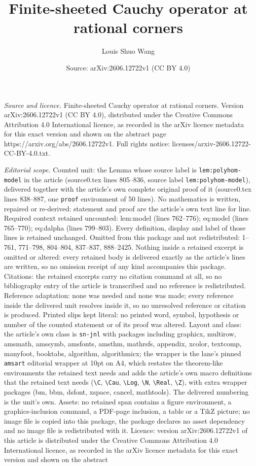 \documentclass[10pt,a4paper]{amsart}
\title[Finite-sheeted Cauchy operator at rational corners]{Finite-sheeted Cauchy operator at rational corners}
\author{Louis Shuo Wang}
\date{Source: arXiv:2606.12722v1 (CC BY 4.0)}
\begin{document}
\maketitle

\noindent\emph{Source and licence.} Finite-sheeted Cauchy operator at rational corners. Version arXiv:2606.12722v1 (CC BY 4.0), distributed under the Creative Commons Attribution 4.0 International licence, as recorded in the arXiv licence metadata for this exact version and shown on the abstract page https://arxiv.org/abs/2606.12722v1. Full rights notice: licenses/arxiv-2606.12722-CC-BY-4.0.txt.\par\smallskip

\noindent\textit{Editorial scope.} Counted unit: the Lemma whose source label is \texttt{lem:polyhom-model} in the article (source0.tex lines 805--836, source label \texttt{lem:polyhom-model}), delivered together with the article's own complete original proof of it (source0.tex lines 838--887, one \texttt{proof} environment of 50 lines). No mathematics is written, repaired or re-derived: statement and proof are the article's own text line for line. Required context retained uncounted: lem:model (lines 762--776); eq:model (lines 765--770); eq:dalpha (lines 799--803). Every definition, display and label of those lines is retained unchanged. Omitted from this package and not redistributed: 1--761, 771--798, 804--804, 837--837, 888--2425. Nothing inside a retained excerpt is omitted or altered: every retained body is delivered exactly as the article's lines are written, so no omission receipt of any kind accompanies this package. Citations: the retained excerpts carry no citation command at all, so no bibliography entry of the article is transcribed and no reference is redistributed. Reference adaptation: none was needed and none was made; every reference inside the delivered unit resolves inside it, so no unresolved reference or citation is produced. Printed slips kept literal: no printed word, symbol, hypothesis or number of the counted statement or of its proof was altered. Layout and class: the article's own class is \texttt{sn-jnl} with packages including graphicx, multirow, amsmath, amssymb, amsfonts, amsthm, mathrsfs, appendix, xcolor, textcomp, manyfoot, booktabs, algorithm, algorithmicx; the wrapper is the lane's pinned \texttt{amsart} editorial wrapper at 10pt on A4, which restates the theorem-like environments the retained text needs and adds the article's own macro definitions that the retained text needs (\texttt{\textbackslash C}, \texttt{\textbackslash Cau}, \texttt{\textbackslash Log}, \texttt{\textbackslash N}, \texttt{\textbackslash Real}, \texttt{\textbackslash Z}), with extra wrapper packages (bm, bbm, dsfont, xspace, cancel, mathtools). The delivered numbering is the unit's own. Assets: no retained span contains a figure environment, a graphics-inclusion command, a PDF-page inclusion, a table or a TikZ picture; no image file is copied into this package, the package declares no asset dependency and no image file is redistributed with it. Licence: version arXiv:2606.12722v1 of this article is distributed under the Creative Commons Attribution 4.0 International licence, as recorded in the arXiv licence metadata for this exact version and shown on the abstract 
\end{document}
